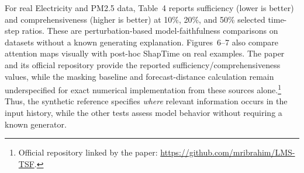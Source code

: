 For real Electricity and PM2.5 data, Table~4 reports sufficiency (lower is
better) and comprehensiveness (higher is better) at 10\%, 20\%, and 50\%
selected time-step ratios. These are perturbation-based model-faithfulness
comparisons on datasets without a known generating explanation. Figures~6--7
also compare attention maps visually with post-hoc ShapTime on real examples.
The paper and its official repository provide the reported
sufficiency/comprehensiveness values, while the masking baseline and
forecast-distance calculation remain underspecified for exact
numerical implementation from these sources alone.\footnote{Official
repository linked by the paper: \url{https://github.com/mribrahim/LMS-TSF}.}
Thus, the synthetic reference specifies \emph{where} relevant information
occurs in the input history, while the other tests assess model behavior
without requiring a known generator.

